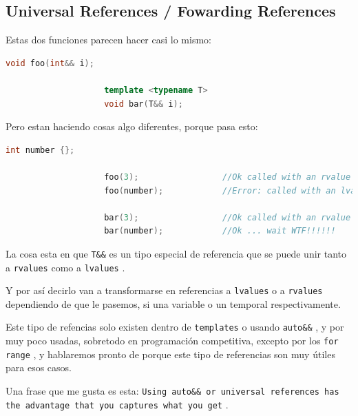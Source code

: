 \documentclass[12pt, fleqn]{report}                             %
\theoremstyle{break}                                            %
\newcommand{\textCode}[1]  { \texttt{#1} }                      %
\begin{document}
                \cite{rvalue2}

            \subsection{Universal References / Fowarding References} 
                
                Estas dos funciones parecen hacer casi lo mismo:
                \begin{lstlisting}[language=C++, gobble=20]
                    void foo(int&& i);
 
                    template <typename T>
                    void bar(T&& i);
                \end{lstlisting}

                Pero estan haciendo cosas algo diferentes, porque pasa esto:
                \begin{lstlisting}[language=C++, gobble=20]
                    int number {};

                    foo(3);                 //Ok called with an rvalue
                    foo(number);            //Error: called with an lvalue

                    bar(3);                 //Ok called with an rvalue
                    bar(number);            //Ok ... wait WTF!!!!!!
                \end{lstlisting}

                La cosa esta en que \textCode{T\&\&} es un tipo especial de referencia que se puede
                unir tanto a \textCode{rvalues} como a \textCode{lvalues}.

                Y por así decirlo van a transformarse en referencias a \textCode{lvalues} o a 
                \textCode{rvalues} dependiendo de que le pasemos, si una variable o un temporal respectivamente.
                
                Este tipo de refencias solo existen dentro de \textCode{templates} o usando
                \textCode{auto\&\&}, y por muy poco usadas, sobretodo en programación competitiva, excepto
                por los \textCode{for range}, y hablaremos pronto de porque este tipo de referencias son muy útiles
                para esos casos.

                Una frase que me gusta es esta: \textCode{Using auto\&\& or universal references 
                has the advantage that you captures what you get}.
\end{document}
